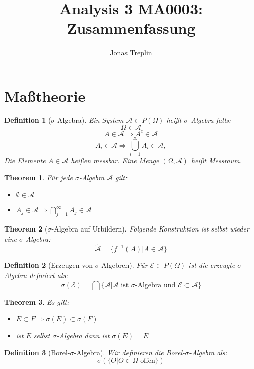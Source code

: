 \documentclass[10pt,a4paper]{article}
\title{Analysis 3 MA0003: Zusammenfassung}
\author{Jonas Treplin}
\newtheorem{theorem}{Theorem}
\newtheorem{definition}{Definition}
\begin{document}
\maketitle

\section{Maßtheorie}
\begin{definition}[$\sigma$-Algebra]
    Ein System $\mathcal{A} \subset P(\Omega)$ heißt $\sigma$-Algebra falls:
    $$\Omega \in \mathcal{A}$$
    $$A\in \mathcal{A} \Rightarrow A^c \in \mathcal{A}$$
    $$A_i \in \mathcal{A} \Rightarrow \bigcup_{i=1}^\infty A_i \in \mathcal{A}, $$
    Die Elemente $A\in \mathcal{A}$ heißen messbar. Eine Menge $(\Omega, \mathcal{A})$ heißt Messraum.
\end{definition}
\begin{theorem}
	Für jede $\sigma$-Algebra $ \mathcal{A}$ gilt:
	\begin{itemize}
		\item  $\emptyset \in \mathcal{A}$
		\item $A_j \in \mathcal{A} \Rightarrow \bigcap_{j=1}^\infty A_j \in \mathcal{A}$
	\end{itemize}
\end{theorem}
\begin{theorem}[$\sigma$-Algebra auf Urbildern]
	Folgende Konstruktion ist selbst wieder eine $\sigma$-Algebra:
	$$\tilde{\mathcal{A}}=\{f^{-1}(A)| A\in \mathcal{A}\}$$
\end{theorem}
\begin{definition}[Erzeugen von $\sigma$-Algebren]
 	Für $\mathcal{E} \subset P(\Omega)$ ist die erzeugte $\sigma$-Algebra definiert als:
 	$$\sigma(\mathcal{E}) = \bigcap\{\mathcal{A}| \mathcal{A} \text{ ist }\sigma\text{-Algebra und } \mathcal{E} \subset \mathcal{A}\}$$
\end{definition}
\begin{theorem}
	Es gilt:
	\begin{itemize}
		\item $E\subset F \Rightarrow \sigma(E) \subset \sigma(F)$
		\item ist $E$ selbst $\sigma$-Algebra dann ist $\sigma(E) = E$
	\end{itemize}
\end{theorem}
\begin{definition}[Borel-$\sigma$-Algebra]
	Wir definieren die Borel-$\sigma$-Algebra als:
	$$\sigma(\{O | O\in \Omega \text{ offen}\})$$
\end{definition}
\end{document}
